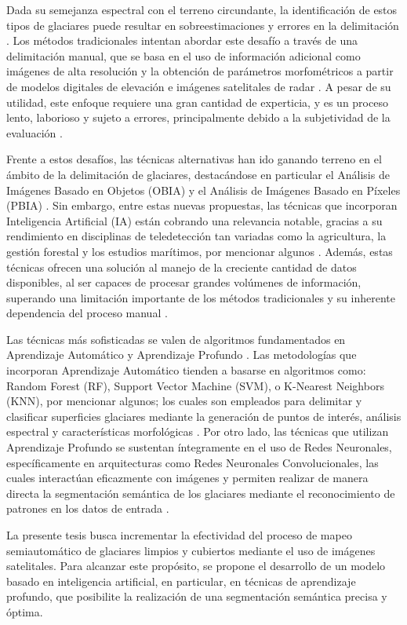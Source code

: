 Dada su semejanza espectral con el terreno circundante, la identificación de estos tipos de glaciares puede resultar en sobreestimaciones y errores en la delimitación \cite{nijhawan2018hybrid}. Los métodos tradicionales intentan abordar este desafío a través de una delimitación manual, que se basa en el uso de información adicional como imágenes de alta resolución y la obtención de parámetros morfométricos a partir de modelos digitales de elevación e imágenes satelitales de radar \cite{fang2017discriminative, lu2020glacier}. A pesar de su utilidad, este enfoque requiere una gran cantidad de experticia, y es un proceso lento, laborioso y sujeto a errores, principalmente debido a la subjetividad de la evaluación \cite{yan2021glacier, zhang2021automated, xie2022progressive, hu2022new}.

Frente a estos desafíos, las técnicas alternativas han ido ganando terreno en el ámbito de la delimitación de glaciares, destacándose en particular el Análisis de Imágenes Basado en Objetos (OBIA) y el Análisis de Imágenes Basado en Píxeles (PBIA) \cite{muhammad2013comparison, rastner2013comparison}. Sin embargo, entre estas nuevas propuestas, las técnicas que incorporan Inteligencia Artificial (IA) están cobrando una relevancia notable, gracias a su rendimiento en disciplinas de teledetección tan variadas como la agricultura, la gestión forestal y los estudios marítimos, por mencionar algunos \cite{hoeser2020object2}. Además, estas técnicas ofrecen una solución al manejo de la creciente cantidad de datos disponibles, al ser capaces de procesar grandes volúmenes de información, superando una limitación importante de los métodos tradicionales y su inherente dependencia del proceso manual \cite{lu2020glacier}.

Las técnicas más sofisticadas se valen de algoritmos fundamentados en Aprendizaje Automático y Aprendizaje Profundo \cite{xie2021evaluating}. Las metodologías que incorporan Aprendizaje Automático tienden a basarse en algoritmos como: Random Forest (RF), Support Vector Machine (SVM), o K-Nearest Neighbors (KNN), por mencionar algunos; los cuales son empleados para delimitar y clasificar superficies glaciares mediante la generación de puntos de interés, análisis espectral y características morfológicas \cite{alifu2020machine, haq2021snow}. Por otro lado, las técnicas que utilizan Aprendizaje Profundo se sustentan íntegramente en el uso de Redes Neuronales, específicamente en arquitecturas como Redes Neuronales Convolucionales, las cuales interactúan eficazmente con imágenes y permiten realizar de manera directa la segmentación semántica de los glaciares mediante el reconocimiento de patrones en los datos de entrada \cite{khan2022deep}.

La presente tesis busca incrementar la efectividad del proceso de mapeo semiautomático de glaciares limpios y cubiertos mediante el uso de imágenes satelitales. Para alcanzar este propósito, se propone el desarrollo de un modelo basado en inteligencia artificial, en particular, en técnicas de aprendizaje profundo, que posibilite la realización de una segmentación semántica precisa y óptima.